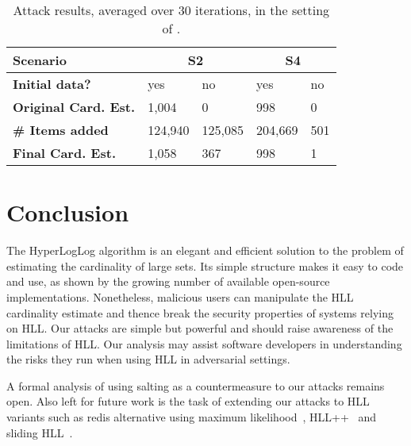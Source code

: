 \documentclass[11pt]{article}
\begin{document}
\begin{table}[h]
\centering
\caption{Attack results, averaged over 30 iterations, in the setting of \cite{hllvuln}.}
\begin{tabular}{| m{8.5em} | m{4em} | m{4em} | m{4em} | m{4em} |}
    \hline
    \textbf{Scenario} & \multicolumn{2}{c|}{S2} & \multicolumn{2}{c|}{S4} \\ \hline
    \textbf{Initial data?} & yes & no & yes & no \\ \hline
    \textbf{Original Card. Est.} & 1,004 & 0 & 998 & 0 \\ \hline
    \textbf{\# Items added} & 124,940 & 125,085 & 204,669 & 501 \\ \hline
    \textbf{Final Card. Est.} & 1,058 & 367 & 998 & 1 \\ \hline
\end{tabular}
\label{table:tab2}
\end{table}

\section{Conclusion}\label{sec:conclusions}
The HyperLogLog algorithm is an elegant and efficient solution to the problem of estimating the cardinality of large sets. Its simple structure makes it easy to code and use, as shown by the growing number of available open-source implementations. Nonetheless, malicious users can manipulate the HLL cardinality estimate and thence break the security properties of systems relying on HLL. Our attacks are simple but powerful and should raise awareness of the limitations of HLL. Our analysis may assist software developers in understanding the risks they run when using HLL in adversarial settings.

A formal analysis of using salting as a countermeasure to our attacks remains open.
Also left for future work is the task of extending our attacks to HLL variants such as redis alternative using maximum likelihood~\cite{newhll}, HLL++~\cite{hllpratice} and sliding HLL~\cite{slidinghll}.



\end{document}
